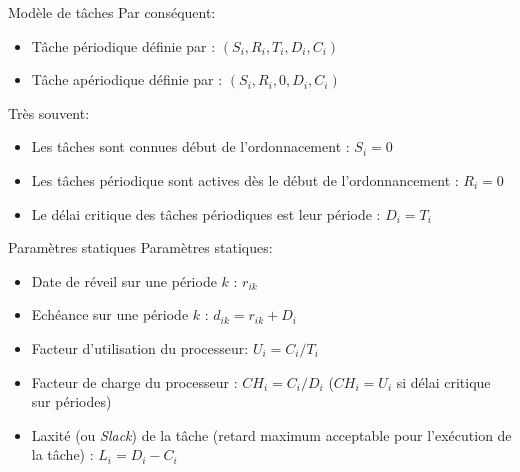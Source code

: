 \begin{frame}{Modèle de tâches}
  Par conséquent: 
  \begin{itemize} 
  \item Tâche périodique définie par : $(S_i, R_i, T_i ,D_i, C_i)$
  \item Tâche apériodique définie par : $(S_i, R_i, 0, D_i, C_i)$
  \end{itemize} 
  Très souvent:
  \begin{itemize}
    \item Les tâches sont connues début de l'ordonnacement : $S_i = 0$
    \item Les tâches périodique sont actives dès le début de
      l'ordonnancement : $R_i = 0$
    \item Le délai critique des  tâches périodiques est leur période  : $D_i =
      T_i$
  \end{itemize}
\end{frame}

\begin{frame}{Paramètres statiques}
  Paramètres statiques:
  \begin{itemize} 
  \item Date de réveil sur une période $k$ : $r_{ik}$
  \item Echéance sur une période $k$ : $d_{ik} = r_{ik} + D_i$
  \item Facteur d'utilisation du processeur: $U_i =  C_i / T_i$
  \item Facteur de charge du processeur : $CH_i = C_i / D_i $ ($CH_i =
    U_i$ si délai critique sur périodes)
  \item Laxité (ou \emph{Slack}) de la tâche (retard maximum acceptable pour l'exécution
    de la tâche) : $L_i = D_i - C_i$
  \end{itemize} 
\end{frame}

